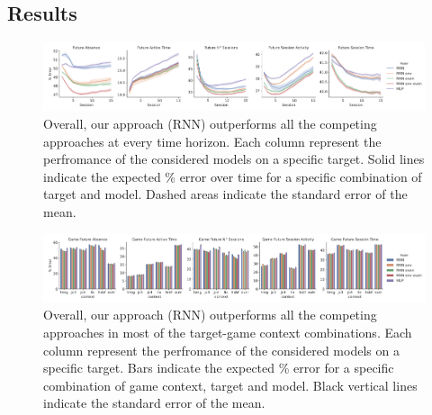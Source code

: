 \subsection{Results}
\label{results_3}
\lorem
\begin{figure}[h]
\centering
\includegraphics[width=\textwidth]{images/chapter_3/models_comparison_collapsed_game_33.png}
\caption[\textbf{Model comparison collapsing over game context}]{ Overall, our approach (RNN) outperforms all the competing approaches at every time horizon. Each column represent the perfromance of the considered models on a specific target. Solid lines indicate the expected \% error over time for a specific combination of target and model. Dashed areas indicate the standard error of the mean.}
\label{model_comp_coll_game_33}
\end{figure}
\lorem
\begin{figure}[h]
\centering
\includegraphics[width=\textwidth]{images/chapter_3/models_comparison_collapsed_time_33.png}
\caption[\textbf{Model comparison collapsing over time}]{ Overall, our approach (RNN) outperforms all the competing approaches in most of the target-game context combinations. Each column represent the perfromance of the considered models on a specific target. Bars indicate the expected \% error for a specific combination of game context, target and model. Black vertical lines indicate the standard error of the mean.}
\label{model_comp_coll_time_33} 
\end{figure}
\lorem
